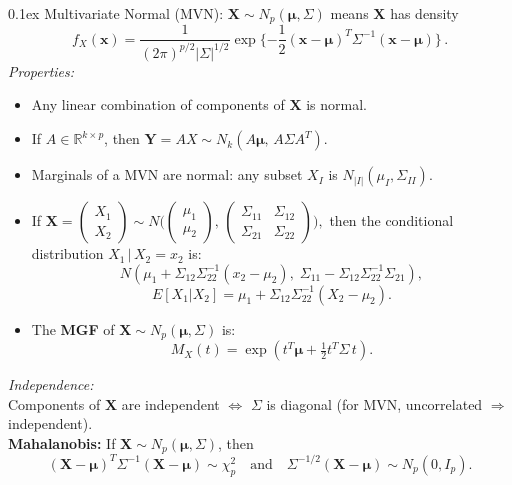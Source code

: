 \documentclass[10pt]{article}
\makeatletter
\renewcommand{\section}{\@startsection{section}{1}{0mm}
  {-0.1ex}%
  {0.1ex}%
  {\normalfont\normalsize\bfseries\color{thm-color}}}
\newcommand{\vect}[1]{\symbf{#1}} %
\makeatother
\begin{document}
\begin{multicols}{3}
  \section{Multivariate Normal (MVN):}
  \( \vect{X}\sim N_p(\vect{\mu},\Sigma) \) means \( \vect{X} \) has density
  \[f_X(\mathbf{\vect{x}}) = \frac{1}{(2\pi)^{p/2}|\Sigma|^{1/2}}\exp\{-\frac{1}{2}(\vect{x}-\vect{\mu})^T\Sigma^{-1}(\vect{x}-\vect{\mu})\}\,.\]
  \textit{Properties:}
  \begin{itemize}[left=0pt,labelsep=1pt]
    \item Any linear combination of components of \( \vect{X} \) is normal.
    \item If \( A \in \mathbb{R}^{k\times p} \), then \( \vect{Y}=AX \sim N_k(A\vect{\mu},\,A\Sigma A^T). \)
    \item Marginals of a MVN are normal: any subset \( X_I \) is \( N_{|I|}(\mu_I,\Sigma_{II}). \)
    \item If \( \vect{X}=\begin{pmatrix}X_1\\ X_2\end{pmatrix}\sim N\Big(\begin{pmatrix}\mu_1\\ \mu_2\end{pmatrix},\,\begin{pmatrix}\Sigma_{11}&\Sigma_{12}\\\Sigma_{21}&\Sigma_{22}\end{pmatrix}\Big),\) then the conditional distribution \( X_1\,|\,X_2=x_2 \) is:
          \[ N\left(\mu_1 + \Sigma_{12}\Sigma_{22}^{-1}(x_2-\mu_2),\; \Sigma_{11}-\Sigma_{12}\Sigma_{22}^{-1}\Sigma_{21} \right), \]
          \[ E[X_1|X_2]=\mu_1 + \Sigma_{12}\Sigma_{22}^{-1}(X_2-\mu_2). \]
    \item The \textbf{MGF} of \( \vect{X}\sim N_p(\vect{\mu},\Sigma) \) is:
          \[ M_X(t)=\exp(t^T \vect{\mu} + \tfrac{1}{2}t^T \Sigma\,t). \]
  \end{itemize}
  \textit{Independence:}\\[0em]
  Components of \( \vect{X} \) are independent \( \iff \) \( \Sigma \) is diagonal (for MVN, uncorrelated \( \Rightarrow \) independent).\\[0em]
  \textbf{Mahalanobis:} If \( \vect{X}\sim N_p(\vect{\mu},\Sigma) \), then
  \[ (\vect{X}-\vect{\mu})^T\Sigma^{-1}(\vect{X}-\vect{\mu}) \sim \chi^2_p \quad \text{and} \quad \Sigma^{-1/2}(\vect{X}-\vect{\mu})\sim N_p(0,I_p). \]


\end{multicols}
\end{document}
